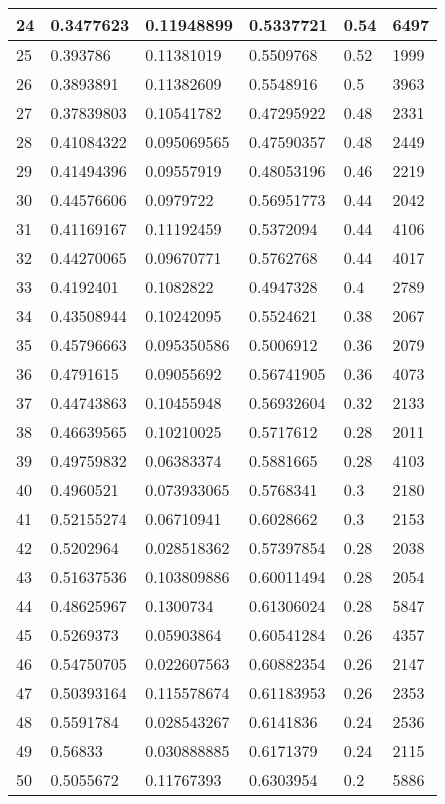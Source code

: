 \begin{longtable}{|l|l|l|l|l|l|}
24 & 0.3477623 & 0.11948899 & 0.5337721 & 0.54 & 6497 \\ \hline 
25 & 0.393786 & 0.11381019 & 0.5509768 & 0.52 & 1999 \\ \hline 
26 & 0.3893891 & 0.11382609 & 0.5548916 & 0.5 & 3963 \\ \hline 
27 & 0.37839803 & 0.10541782 & 0.47295922 & 0.48 & 2331 \\ \hline 
28 & 0.41084322 & 0.095069565 & 0.47590357 & 0.48 & 2449 \\ \hline 
29 & 0.41494396 & 0.09557919 & 0.48053196 & 0.46 & 2219 \\ \hline 
30 & 0.44576606 & 0.0979722 & 0.56951773 & 0.44 & 2042 \\ \hline 
31 & 0.41169167 & 0.11192459 & 0.5372094 & 0.44 & 4106 \\ \hline 
32 & 0.44270065 & 0.09670771 & 0.5762768 & 0.44 & 4017 \\ \hline 
33 & 0.4192401 & 0.1082822 & 0.4947328 & 0.4 & 2789 \\ \hline 
34 & 0.43508944 & 0.10242095 & 0.5524621 & 0.38 & 2067 \\ \hline 
35 & 0.45796663 & 0.095350586 & 0.5006912 & 0.36 & 2079 \\ \hline 
36 & 0.4791615 & 0.09055692 & 0.56741905 & 0.36 & 4073 \\ \hline 
37 & 0.44743863 & 0.10455948 & 0.56932604 & 0.32 & 2133 \\ \hline 
38 & 0.46639565 & 0.10210025 & 0.5717612 & 0.28 & 2011 \\ \hline 
39 & 0.49759832 & 0.06383374 & 0.5881665 & 0.28 & 4103 \\ \hline 
40 & 0.4960521 & 0.073933065 & 0.5768341 & 0.3 & 2180 \\ \hline 
41 & 0.52155274 & 0.06710941 & 0.6028662 & 0.3 & 2153 \\ \hline 
42 & 0.5202964 & 0.028518362 & 0.57397854 & 0.28 & 2038 \\ \hline 
43 & 0.51637536 & 0.103809886 & 0.60011494 & 0.28 & 2054 \\ \hline 
44 & 0.48625967 & 0.1300734 & 0.61306024 & 0.28 & 5847 \\ \hline 
45 & 0.5269373 & 0.05903864 & 0.60541284 & 0.26 & 4357 \\ \hline 
46 & 0.54750705 & 0.022607563 & 0.60882354 & 0.26 & 2147 \\ \hline 
47 & 0.50393164 & 0.115578674 & 0.61183953 & 0.26 & 2353 \\ \hline 
48 & 0.5591784 & 0.028543267 & 0.6141836 & 0.24 & 2536 \\ \hline 
49 & 0.56833 & 0.030888885 & 0.6171379 & 0.24 & 2115 \\ \hline 
50 & 0.5055672 & 0.11767393 & 0.6303954 & 0.2 & 5886 \\ \hline 
\end{longtable}